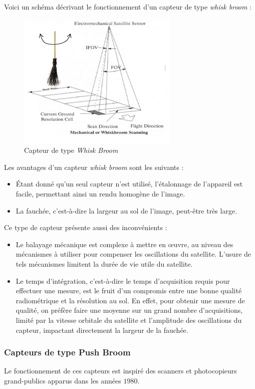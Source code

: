 \documentclass[a4paper, 11pt]{report}
\begin{document}
Voici un schéma décrivant le fonctionnement d'un capteur de type \emph{whisk broom} :
\begin{figure}[H]
	\begin{center}
		\includegraphics[scale=0.7]{Images/Whisk_Broom.jpg}
		\caption{Capteur de type \emph{Whisk Broom}}
	\end{center}
\end{figure}
Les avantages d'un capteur \emph{whisk broom} sont les suivants :
\begin{itemize}
	\item Étant donné qu'un seul capteur n'est utilisé, l'étalonnage de l'appareil est facile, permettant ainsi un rendu homogène de l'image.
	\item La fauchée, c'est-à-dire la largeur au sol de l'image, peut-être très large.
\end{itemize}
Ce type de capteur présente aussi des inconvénients :
\begin{itemize}
	\item Le balayage mécanique est complexe à mettre en œuvre, au niveau des mécanismes à utiliser pour compenser les oscillations du satellite. L'usure de tels mécanismes limitent la durée de vie utile du satellite.
	\item Le temps d'intégration, c'est-à-dire le temps d'acquisition requis pour effectuer une mesure, est le fruit d'un compromis entre une bonne qualité radiométrique et la résolution au sol. En effet, pour obtenir une mesure de qualité, on préfère faire une moyenne sur un grand nombre d'acquisitions, limité par la vitesse orbitale du satellite et l'amplitude des oscillations du capteur, impactant directement la largeur de la fauchée.
\end{itemize}
\subsubsection{Capteurs de type Push Broom}
Le fonctionnement de ces capteurs est inspiré des scanners et photocopieurs grand-publics apparus dans les années $1980$.
\end{document}
